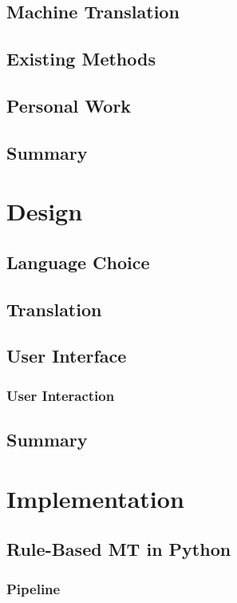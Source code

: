 \documentclass[12pt]{ociamthesis}  %
\begin{document}
\section{Machine Translation}
\label{machine translation}
\section{Existing Methods}
\section{Personal Work}
\section{Summary}


\chapter{Design}

\section{Language Choice}
\section{Translation}
\section{User Interface}
	\subsection{User Interaction}
\section{Summary}


\chapter{Implementation}

\section{Rule-Based MT in Python}
	\subsection{Pipeline}
\end{document}
